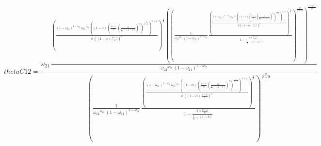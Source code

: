 \begin{dmath*}
thetaC12 = \frac{{{\omega_{21}}}\, \frac{\left(\frac{\left(1-{{\omega_{21}}}\right)^{1-{{\omega_{21}}}}\, {{\omega_{21}}}^{{{\omega_{21}}}}\, \left(\left(1-{{\alpha}}\right)\, \left(\frac{{{\psi}}-1}{{{\psi}}}\, \left(\frac{{{\alpha}}}{\frac{1}{{{\beta}}}-\left(1-{{\delta}}\right)}\right)^{{{\alpha}}}\right)^{\frac{1}{1-{{\alpha}}}}\right)^{1+{{\varphi}}}}{{{\phi}}\, \left(\left(1-{{\alpha}}\right)\, \frac{{{\psi}}-1}{{{\psi}}}\right)^{{{\varphi}}}}\right)^{\frac{1}{{{\sigma}}}}\, \left(\left(\frac{1}{{{\omega_{21}}}^{{{\omega_{21}}}}\, \left(1-{{\omega_{21}}}\right)^{1-{{\omega_{21}}}}}\, \frac{\left(\frac{\left(1-{{\omega_{21}}}\right)^{1-{{\omega_{21}}}}\, {{\omega_{21}}}^{{{\omega_{21}}}}\, \left(\left(1-{{\alpha}}\right)\, \left(\frac{{{\psi}}-1}{{{\psi}}}\, \left(\frac{{{\alpha}}}{\frac{1}{{{\beta}}}-\left(1-{{\delta}}\right)}\right)^{{{\alpha}}}\right)^{\frac{1}{1-{{\alpha}}}}\right)^{1+{{\varphi}}}}{{{\phi}}\, \left(\left(1-{{\alpha}}\right)\, \frac{{{\psi}}-1}{{{\psi}}}\right)^{{{\varphi}}}}\right)^{\frac{1}{{{\sigma}}}}}{1-\frac{{{\delta}}\, {{\alpha}}\, \frac{{{\psi}}-1}{{{\psi}}}}{\frac{1}{{{\beta}}}-\left(1-{{\delta}}\right)}}\right)^{\frac{{{\sigma}}}{{{\varphi}}+{{\sigma}}}}\right)^{\frac{\left(-{{\varphi}}\right)}{{{\sigma}}}}}{{{\omega_{21}}}^{{{\omega_{21}}}}\, \left(1-{{\omega_{21}}}\right)^{1-{{\omega_{21}}}}}}{\left(\frac{1}{{{\omega_{11}}}^{{{\omega_{11}}}}\, \left(1-{{\omega_{11}}}\right)^{1-{{\omega_{11}}}}}\, \frac{\left(\frac{\left(1-{{\omega_{11}}}\right)^{1-{{\omega_{11}}}}\, {{\omega_{11}}}^{{{\omega_{11}}}}\, \left(\left(1-{{\alpha}}\right)\, \left(\frac{{{\psi}}-1}{{{\psi}}}\, \left(\frac{{{\alpha}}}{\frac{1}{{{\beta}}}-\left(1-{{\delta}}\right)}\right)^{{{\alpha}}}\right)^{\frac{1}{1-{{\alpha}}}}\right)^{1+{{\varphi}}}}{{{\phi}}\, \left(\left(1-{{\alpha}}\right)\, \frac{{{\psi}}-1}{{{\psi}}}\right)^{{{\varphi}}}}\right)^{\frac{1}{{{\sigma}}}}}{1-\frac{{{\delta}}\, {{\alpha}}\, \frac{{{\psi}}-1}{{{\psi}}}}{\frac{1}{{{\beta}}}-\left(1-{{\delta}}\right)}}\right)^{\frac{{{\sigma}}}{{{\varphi}}+{{\sigma}}}}}
\end{dmath*}

